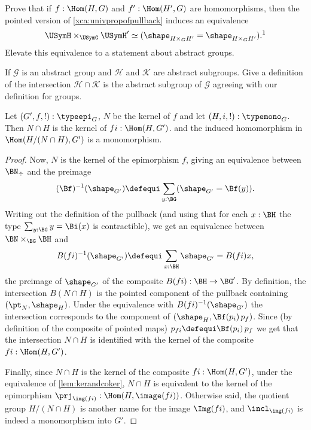 \begin{xca}
  Prove that if $f:\Hom(H,G)$ and $f':\Hom(H',G)$ are homomorphisms,
  then the pointed version of \cref{xca:univpropofpullback} induces an equivalence
  \[
    \USymH \times_{\USymG} \USymH'
    \simeq (\shape_{H\times_GH'}=\shape_{H\times_GH'}).\text{\footnotemark}
  \]
  Elevate this equivalence to a statement about abstract groups.
\end{xca}

\begin{xca}
  If $\mathcal G$ is an abstract group and $\mathcal H$ and $\mathcal K$ are abstract subgroups.  Give a definition of the intersection $\mathcal H\cap\mathcal K$ is the abstract subgroup of $\mathcal G$ agreeing with our definition for groups.
\end{xca}
\begin{lemma}
  \label{lem:whatSylow2needs}
  Let $(G',f,!):\typeepi_G$, $N$ be the kernel of $f$  and let $(H,i,!):\typemono_G$.  Then
$N\cap H$ is the kernel of $fi:\Hom(H,G')$.  %
and the induced homomorphism in $\Hom(H/(N\cap H),G')$ is a monomorphism.
  \begin{proof}
Now, $N$ is the kernel of the epimorphism $f$, giving an equivalence between $\BN_\div$ and the preimage
$$(\Bf)^{-1}(\shape_{G'})\defequi\sum_{y:\BG}(\shape_{G'}=\Bf(y)).$$
Writing out the definition of the pullback (and using that for each $x:\BH$ the type $\sum_{y:\BG}y=\Bi(x)$ is contractible), we get an equivalence between $\BN\times_{\BG}\BH$ and
$$B(fi)^{-1}(\shape_{G'})\defequi\sum_{x:\BH}\shape_{G'}=B(fi)x,$$
the preimage of $\shape_{G'}$ of the composite $B(fi):\BH\to \BG'$.
 By definition, the intersection $B(N\cap H)$ is the pointed component of the pullback containing $(\pt_N,\shape_H)$.  Under the equivalence with $B(fi)^{-1}(\shape_{G'})$ the intersection corresponds to the component of $(\shape_H,\Bf(p_i)\,p_f)%
 $.
Since (by definition of the composite of pointed maps) $p_{fi}\defequi \Bf(p_i)\,p_f$ we get that the intersection $N\cap H$ is identified with the kernel of the composite $fi:\Hom(H,G')$.

Finally, since $N\cap H$ is the kernel of the composite $fi:\Hom(H,G')$, under the equivalence of \cref{lem:kerandcoker}, $N\cap H$ is equivalent to the kernel of the epimorphism $\prj_{\img(fi)}:\Hom(H,\image (fi))$.  Otherwise said, the quotient group $H/(N\cap H)$ is another name for the image $\Img (fi)$, and $\incl_{\img(fi)}$ is indeed a monomorphism into $G'$.
  \end{proof}
\end{lemma}
